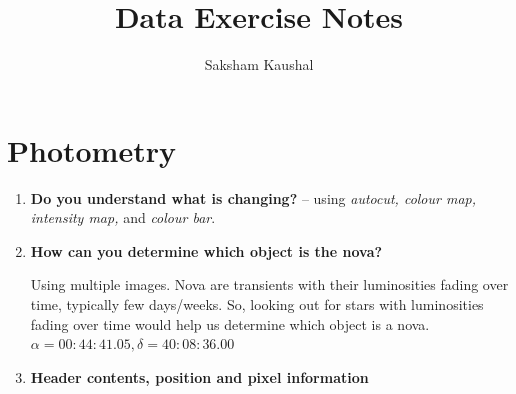 \documentclass{article}
\title{Data Exercise Notes}
\author{Saksham Kaushal}
\begin{document}
	\maketitle
	
	\section{Photometry}
	\begin{enumerate}
		
		\item \textbf{Do you understand what is changing?} -- using \emph{autocut, colour map, intensity map,} and \emph{colour bar}.
		
		\item \textbf{How can you determine which object is the nova?}
		
		Using multiple images. Nova are transients with their luminosities fading over time, typically few days/weeks. So, looking out for stars with luminosities fading over time would help us determine which object is a nova.
		\(\alpha = 00:44:41.05, \delta = 40:08:36.00\)
		
		\item \textbf{Header contents, position and pixel information}
		

\end{enumerate}
\end{document}
